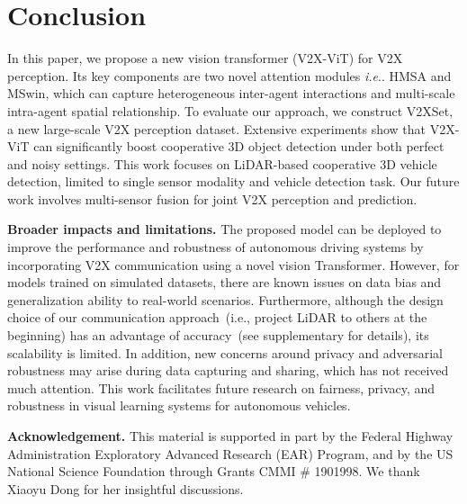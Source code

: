 \documentclass[runningheads]{llncs}
\makeatletter
\DeclareRobustCommand\onedot{\futurelet\@let@token\@onedot}
\def\@onedot{\ifx\@let@token.\else.\null\fi\xspace}
\def\ie{\emph{i.e}\onedot} \def\Ie{\emph{I.e}\onedot}
\makeatother
\begin{document}
\section{Conclusion}
In this paper, we propose a new vision transformer (V2X-ViT) for V2X perception. Its key components are two novel attention modules \ie HMSA and MSwin, which can capture heterogeneous inter-agent interactions and multi-scale intra-agent spatial relationship. 
To evaluate our approach, we construct V2XSet, a new large-scale V2X perception dataset.
Extensive experiments show that V2X-ViT can significantly boost cooperative 3D object detection under both perfect and noisy settings. 
This work focuses on LiDAR-based cooperative 3D vehicle detection, limited to single sensor modality and vehicle detection task.
Our future work involves multi-sensor fusion for joint V2X  perception and prediction.

\vspace{2mm}
\noindent\textbf{Broader impacts and limitations.} The proposed model can be deployed to improve the performance and robustness of autonomous driving systems by incorporating V2X communication using a novel vision Transformer. 
However, for models trained on simulated datasets, 
there are known issues on data bias and generalization ability to real-world scenarios. 
Furthermore, although the design choice of our communication approach~(i.e., project LiDAR to others at the beginning) has an advantage of accuracy~(see supplementary for details), its scalability is limited.
In addition, new concerns around privacy and adversarial robustness may arise during data capturing and sharing, which has not received much attention. 
This work facilitates future research on fairness, privacy, and robustness in visual learning systems for autonomous vehicles.  

\vspace{2mm}
\noindent\textbf{Acknowledgement.} This material is supported in part by the
Federal Highway Administration Exploratory Advanced Research (EAR) Program, and by the US National Science Foundation through Grants CMMI \# 1901998. We thank Xiaoyu Dong for her insightful discussions.




\clearpage



\appendix
\end{document}
